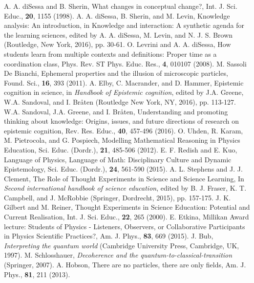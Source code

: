 \documentclass[twocolumn,secnumarabic,amssymb, nobibnotes, aps, prd, nofootinbib]{revtex4-2}
\begin{document}
\begin{thebibliography}{99}
 A. A. diSessa and B. Sherin, What changes in conceptual change?, Int. J. Sci. Educ., \textbf{20}, 1155 (1998).
 A. A. diSessa, B. Sherin, and M. Levin, Knowledge analysis: An introduction, in {Knowledge and interaction: A synthetic agenda for the learning sciences}, edited by A. A. diSessa, M. Levin, and N. J. S. Brown  (Routledge, New York, 2016), pp. 30-61.
 O. Levrini and A. A. diSessa, How students learn from multiple contexts and definitions: Proper time as a coordination class, Phys. Rev. ST Phys. Educ. Res., \textbf{4}, 010107 (2008).
 M. Sassoli De Bianchi, Ephemeral properties and the illusion of microscopic particles, Found. Sci.,  \textbf{16}, 393 (2011).
 A. Elby, C. Macrander, and D. Hammer, Epistemic cognition in science, in  \textit{Handbook of Epistemic cognition}, edited by J.A. Greene, W.A. Sandoval, and I. Br{\aa}ten (Routledge New York, NY, 2016), pp. 113-127.
 W.A. Sandoval, J.A. Greene, and I. Br{\aa}ten, Understanding and promoting thinking about knowledge: Origins, issues, and future directions of research on epistemic cognition, Rev. Res. Educ., \textbf{40}, 457-496 (2016).
 O. Uhden, R. Karam, M. Pietrocola, and G. Pospiech, Modelling Mathematical Reasoning in Physics Education, Sci. Educ. (Dordr.), \textbf{21}, 485-506 (2012).
 E. F. Redish and E. Kuo, Language of Physics, Language of Math: Disciplinary Culture and Dynamic Epistemology, Sci. Educ. (Dordr.), \textbf{24}, 561-590 (2015).
 A. L. Stephens and J. J. Clement, The Role of Thought Experiments in Science and Science Learning, In \textit{Second international handbook of science education}, edited by B. J. Fraser, K. T. Campbell, and J. McRobbie (Springer, Dordrecht, 2015), pp. 157-175.
 J. K. Gilbert and M. Reiner, Thought Experiments in Science Education: Potential and Current Realisation, Int. J. Sci. Educ., \textbf{22}, 265 (2000).
 E. Etkina, Millikan Award lecture: Students of Physics - Listeners, Observers, or Collaborative Participants in Physics Scientific Practices?, Am. J. Phys., \textbf{83}, 669 (2015).
 J. Bub, \textit{Interpreting the quantum world} (Cambridge University Press, Cambridge, UK, 1997).
 M. Schlosshauer, \textit{Decoherence and the quantum-to-classical-transition} (Springer, 2007).
 A. Hobson, There are no particles, there are only fields, Am. J. Phys., \textbf{81}, 211 (2013).

\end{thebibliography}
\end{document}
